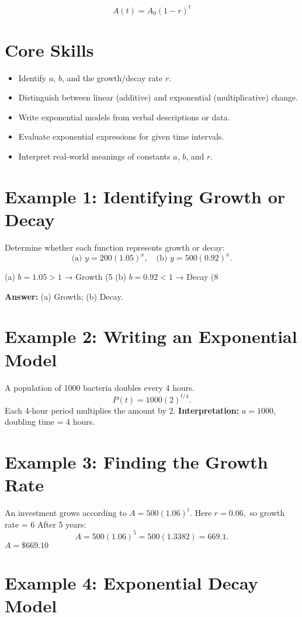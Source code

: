 \documentclass[12pt]{article}
\begin{document}
\[
A(t) = A_0 (1 - r)^t
\]

\section*{Core Skills}
\begin{itemize}
  \item Identify \(a\), \(b\), and the growth/decay rate \(r\).
  \item Distinguish between linear (additive) and exponential (multiplicative) change.
  \item Write exponential models from verbal descriptions or data.
  \item Evaluate exponential expressions for given time intervals.
  \item Interpret real-world meanings of constants \(a\), \(b\), and \(r\).
\end{itemize}

\section*{Example 1: Identifying Growth or Decay}

Determine whether each function represents growth or decay:
\[
\text{(a) } y = 200(1.05)^x, \quad \text{(b) } y = 500(0.92)^x.
\]

(a) \(b = 1.05 > 1\) → Growth (5%
(b) \(b = 0.92 < 1\) → Decay (8%

\textbf{Answer:} (a) Growth; (b) Decay.

\section*{Example 2: Writing an Exponential Model}

A population of 1000 bacteria doubles every 4 hours.  
\[
P(t) = 1000(2)^{t/4}.
\]
Each 4-hour period multiplies the amount by 2.  
\textbf{Interpretation:} \(a = 1000\), doubling time = 4 hours.

\section*{Example 3: Finding the Growth Rate}

An investment grows according to \(A = 500(1.06)^t.\)  
Here \(r = 0.06,\) so growth rate = 6%
After 5 years:
\[
A = 500(1.06)^5 = 500(1.3382) = 669.1.
\]
\(\boxed{A = \$669.10}\)

\section*{Example 4: Exponential Decay Model}
\end{document}
